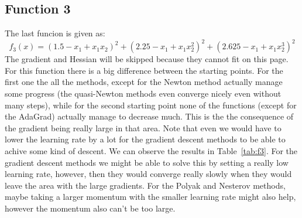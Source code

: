 \documentclass[9pt]{IEEEtran}
\begin{document}
\subsection{Function 3}
The last funcion is given as:
\[
f_3(x) = (1.5 - x_1 + x_1 x_2)^2 + (2.25 - x_1 + x_1 x_2^2)^2 + (2.625 - x_1 + x_1 x_2^3)^2
\]
The gradient and Hessian will be skipped because they cannot fit on this page.
\\
For this function there is a big difference between the starting points. For the first one the all the methods, 
except for the Newton method actually manage some progress (the quasi-Newton methods even converge 
nicely even without many steps), while for the second starting point none of the functions 
(except for the AdaGrad) actually manage to decrease much.
This is the the consequence of the gradient being really large in that area. Note that even 
we would have to lower the learning rate by a lot for the gradient descent methods to be 
able to achive some kind of descent. We can observe the results in Table~\ref{tab:f3}.
For the gradient descent methods we might be able to solve this by setting a really low learning rate, 
however, then they would converge really slowly when they would leave the area with the large gradients. 
For the Polyak and Nesterov methods, maybe taking a larger momentum with the smaller learning rate might 
also help, however the momentum also can't be too large.
\end{document}
